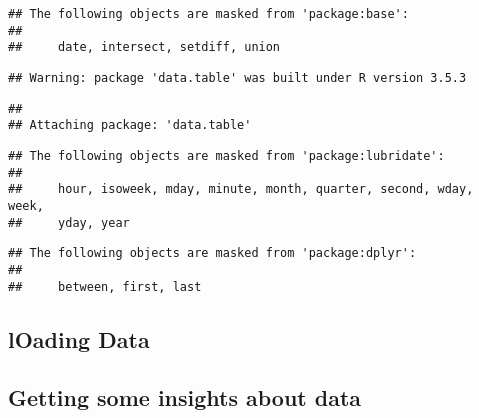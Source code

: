 \documentclass[
]{article}
\newenvironment{Shaded}{\begin{snugshade}}{\end{snugshade}}
\newcommand{\DataTypeTok}[1]{\textcolor[rgb]{0.13,0.29,0.53}{#1}}
\newcommand{\KeywordTok}[1]{\textcolor[rgb]{0.13,0.29,0.53}{\textbf{#1}}}
\newcommand{\NormalTok}[1]{#1}
\newcommand{\OperatorTok}[1]{\textcolor[rgb]{0.81,0.36,0.00}{\textbf{#1}}}
\newcommand{\StringTok}[1]{\textcolor[rgb]{0.31,0.60,0.02}{#1}}
\begin{document}
\begin{verbatim}
## The following objects are masked from 'package:base':
## 
##     date, intersect, setdiff, union
\end{verbatim}

\begin{verbatim}
## Warning: package 'data.table' was built under R version 3.5.3
\end{verbatim}

\begin{verbatim}
## 
## Attaching package: 'data.table'
\end{verbatim}

\begin{verbatim}
## The following objects are masked from 'package:lubridate':
## 
##     hour, isoweek, mday, minute, month, quarter, second, wday, week,
##     yday, year
\end{verbatim}

\begin{verbatim}
## The following objects are masked from 'package:dplyr':
## 
##     between, first, last
\end{verbatim}

\hypertarget{loading-data}{%
\subsection{lOading Data}\label{loading-data}}

\begin{Shaded}
\end{Shaded}

\hypertarget{getting-some-insights-about-data}{%
\subsection{Getting some insights about
data}\label{getting-some-insights-about-data}}
\end{document}
